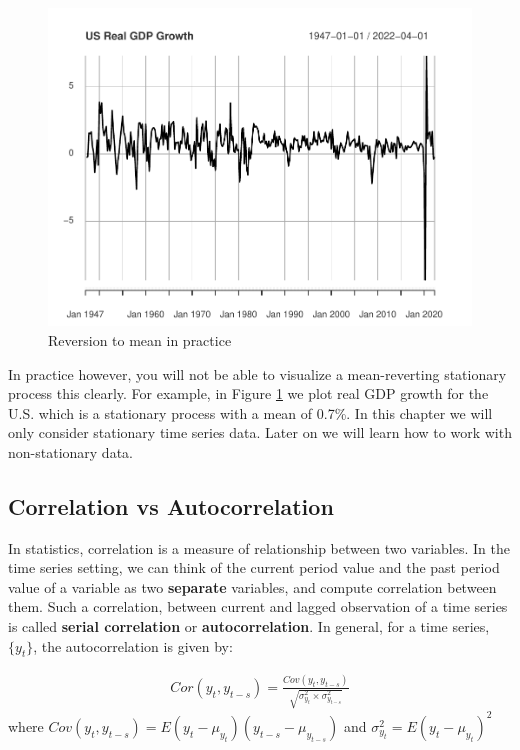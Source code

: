 \documentclass[]{book}
\theoremstyle{definition}
\theoremstyle{definition}
\theoremstyle{definition}
\theoremstyle{remark}
\begin{document}
\begin{figure}

{\centering \includegraphics[width=0.8\linewidth]{bookdown-demo_files/figure-latex/ch6-figure2-1} 

}

\caption{Reversion to mean in practice}\label{fig:ch6-figure2}
\end{figure}

In practice however, you will not be able to visualize a mean-reverting stationary process this clearly. For example, in Figure \ref{fig:ch6-figure2} we plot real GDP growth for the U.S. which is a stationary process with a mean of 0.7\%. In this chapter we will only consider stationary time series data. Later on we will learn how to work with non-stationary data.

\hypertarget{correlation-vs-autocorrelation}{%
\subsection{Correlation vs Autocorrelation}\label{correlation-vs-autocorrelation}}

In statistics, correlation is a measure of relationship between two variables. In the time series setting, we can think of the current period value and the past period value of a variable as two \textbf{separate} variables, and compute correlation between them. Such a correlation, between current and lagged observation of a time series is called \textbf{serial correlation} or \textbf{autocorrelation}. In general, for a time series, \(\{y_t\}\), the autocorrelation is given by:

\begin{align}
    Cor(y_t,y_{t-s})=\frac{ Cov(y_t,y_{t-s})}{\sqrt{\sigma^2_{y_t} \times \sigma^2_{y_{t-s}}}}
        \end{align}
where \(Cov(y_t,y_{t-s})= E(y_t-\mu_{y_t})(y_{t-s}-\mu_{y_{t-s}})\) and \(\sigma^2_{y_t}=E(y_t-\mu_{y_t})^2\)
\end{document}

